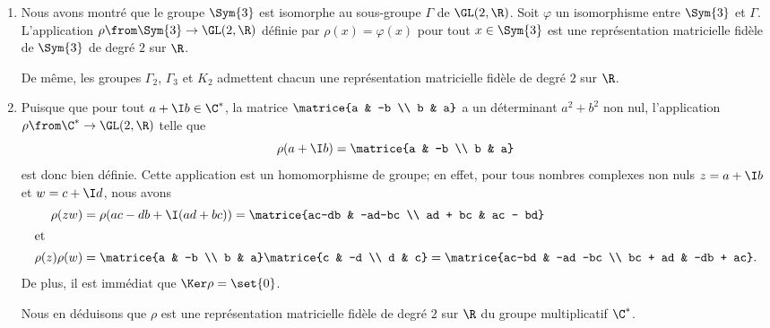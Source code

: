 \begin{enumerate}
  \item
    Nous avons montré que le groupe $\Sym{3}$ est isomorphe au sous-groupe $\Gamma$ de $\GL(2,\R)$.
    Soit $\varphi$ un isomorphisme entre $\Sym{3}$ et $\Gamma$.
    L'application $\rho\from\Sym{3}\to\GL(2,\R)$ définie par $\rho(x) = \varphi(x)$ pour tout $x\in\Sym{3}$ est une représentation matricielle fidèle de $\Sym{3}$ de degré $2$ sur $\R$.

    De même, les groupes $\Gamma_2$, $\Gamma_3$ et $K_2$ admettent chacun une représentation matricielle fidèle de degré $2$ sur $\R$.

  \item
    Puisque que pour tout $a+\I b\in\C^*$, la matrice $\matrice{a & -b \\ b & a}$ a un déterminant $a^2+b^2$ non nul, l'application $\rho\from\C^*\to\GL(2,\R)$ telle que
    \[
      \rho(a+\I b) = \matrice{a & -b \\ b & a}
    \]
    est donc bien définie.
    Cette application est un homomorphisme de groupe; en effet, pour tous nombres complexes non nuls $z = a+\I b$ et $w = c+\I d$, nous avons
    \begin{align*}
      \rho(zw)
        &= \rho(ac-db + \I (ad + bc))
         = \matrice{ac-db & -ad-bc \\ ad + bc & ac - bd} \\
      \intertext{et}
      \rho(z)\rho(w)
        &= \matrice{a & -b \\ b & a}\matrice{c & -d \\ d & c}
         = \matrice{ac-bd & -ad -bc \\ bc + ad & -db + ac}.
    \end{align*}
    De plus, il est immédiat que $\Ker \rho = \set{0}$.

    Nous en déduisons que $\rho$ est une représentation matricielle fidèle de degré $2$ sur $\R$  du groupe multiplicatif $\C^*$.
\end{enumerate}

